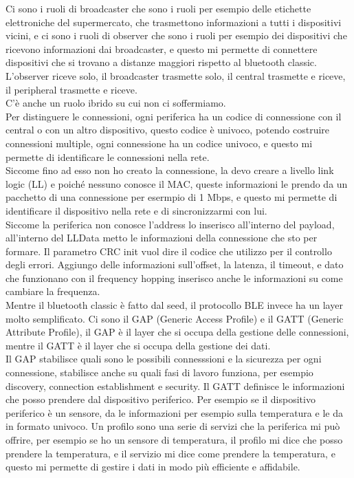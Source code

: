 Ci sono i ruoli di broadcaster che sono i ruoli per esempio delle etichette elettroniche del supermercato, che trasmettono informazioni a tutti i dispositivi vicini, e ci sono i ruoli di observer che sono i ruoli per esempio dei dispositivi che ricevono informazioni dai broadcaster, e questo mi permette di connettere dispositivi che si trovano a distanze maggiori rispetto al bluetooth classic. L'observer riceve solo, il broadcaster trasmette solo, il central trasmette e riceve, il peripheral trasmette e riceve.\\

C'è anche un ruolo ibrido su cui non ci soffermiamo.\\

Per distinguere le connessioni, ogni periferica ha un codice di connessione con il central o con un altro dispositivo, questo codice è univoco, potendo costruire connessioni multiple, ogni connessione ha un codice univoco, e questo mi permette di identificare le connessioni nella rete.\\

Siccome fino ad esso non ho creato la connessione, la devo creare a livello link logic (LL) e poiché nessuno conosce il MAC, queste informazioni le prendo da un pacchetto di una connessione per esermpio di 1 Mbps, e questo mi permette di identificare il dispositivo nella rete e di sincronizzarmi con lui.\\

Siccome la periferica non conosce l'address lo inserisco all'interno del payload, all'interno del LLData metto le informazioni della connessione che sto per formare. Il parametro CRC init vuol dire il codice che utilizzo per il controllo degli errori. Aggiungo delle informazioni sull'offset, la latenza, il timeout, e dato che funzionano con il frequency hopping inserisco anche le informazioni su come cambiare la frequenza.\\

Mentre il bluetooth classic è fatto dal seed, il protocollo BLE invece ha un layer molto semplificato. Ci sono il GAP (Generic Access Profile) e il GATT (Generic Attribute Profile), il GAP è il layer che si occupa della gestione delle connessioni, mentre il GATT è il layer che si occupa della gestione dei dati.\\
Il GAP stabilisce quali sono le possibili connesssioni e la sicurezza per ogni connessione, stabilisce anche su quali fasi di lavoro funziona, per esempio discovery, connection establishment e security. 
Il GATT definisce le informazioni che posso prendere dal dispositivo periferico. Per esempio se il dispositivo periferico è un sensore, da le informazioni per esempio sulla temperatura e le da in formato univoco. Un profilo sono una serie di servizi che la periferica mi può offrire, per esempio se ho un sensore di temperatura, il profilo mi dice che posso prendere la temperatura, e il servizio mi dice come prendere la temperatura, e questo mi permette di gestire i dati in modo più efficiente e affidabile.\\

